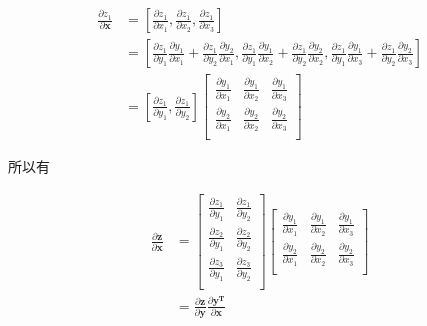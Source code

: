 \documentclass[lang=cn,newtx,10pt,scheme=chinese]{elegantbook}
\begin{document}
\begin{equation*}
  \begin{aligned}
    \frac{\partial z_1}{\partial \mathbf{x}} &= 
    [\frac{\partial z_1}{\partial x_1}, \frac{\partial z_1}{\partial x_2}, \frac{\partial z_1}{\partial x_3}] \\
    &=
    [
      \frac{\partial z_1}{\partial y_1}\frac{\partial y_1}{\partial x_1}+\frac{\partial z_1}{\partial y_2}\frac{\partial y_2}{\partial x_1},
      \frac{\partial z_1}{\partial y_1}\frac{\partial y_1}{\partial x_2}+\frac{\partial z_1}{\partial y_2}\frac{\partial y_2}{\partial x_2},
      \frac{\partial z_1}{\partial y_1}\frac{\partial y_1}{\partial x_3}+\frac{\partial z_1}{\partial y_2}\frac{\partial y_2}{\partial x_3}
    ] \\
    &=
    [\frac{\partial z_1}{\partial y_1}, \frac{\partial z_1}{\partial y_2}]
    \begin{bmatrix}
      \frac{\partial y_1}{\partial x_1} & \frac{\partial y_1}{\partial x_2} & \frac{\partial y_1}{\partial x_3} \\
      \frac{\partial y_2}{\partial x_1} & \frac{\partial y_2}{\partial x_2} & \frac{\partial y_2}{\partial x_3} \\
    \end{bmatrix}
  \end{aligned}
\end{equation*}

所以有

\begin{equation*}
  \begin{aligned}
    \frac{\partial \mathbf{z}}{\partial \mathbf{x}} &= 
    \begin{bmatrix}
      \frac{\partial z_1}{\partial y_1} & \frac{\partial z_1}{\partial y_2} \\
      \frac{\partial z_2}{\partial y_1} & \frac{\partial z_2}{\partial y_2} \\
      \frac{\partial z_3}{\partial y_1} & \frac{\partial z_3}{\partial y_2} \\
    \end{bmatrix}
    \begin{bmatrix}
      \frac{\partial y_1}{\partial x_1} & \frac{\partial y_1}{\partial x_2} & \frac{\partial y_1}{\partial x_3} \\
      \frac{\partial y_2}{\partial x_1} & \frac{\partial y_2}{\partial x_2} & \frac{\partial y_2}{\partial x_3} \\
    \end{bmatrix} \\
    &=
    \frac{\partial \mathbf{z}}{\partial \mathbf{y}}
    \frac{\partial \mathbf{y^T}}{\partial \mathbf{x}}
  \end{aligned}
\end{equation*}
\end{document}
